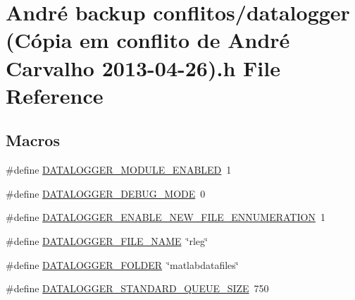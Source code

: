 \hypertarget{datalogger_01_07C_xC3_xB3pia_01em_01conflito_01de_01Andr_xC3_xA9_01Carvalho_012013-04-26_08_8h}{\section{André backup conflitos/datalogger (Cópia em conflito de André Carvalho 2013-\/04-\/26).h File Reference}
\label{datalogger_01_07C_xC3_xB3pia_01em_01conflito_01de_01Andr_xC3_xA9_01Carvalho_012013-04-26_08_8h}
}
\subsection*{Macros}
\begin{DoxyCompactItemize}
\item 
\#define \hyperlink{datalogger_01_07C_xC3_xB3pia_01em_01conflito_01de_01Andr_xC3_xA9_01Carvalho_012013-04-26_08_8h_ac8cb2695f86c0cbaffc8a955d446bcd8}{D\-A\-T\-A\-L\-O\-G\-G\-E\-R\-\_\-\-M\-O\-D\-U\-L\-E\-\_\-\-E\-N\-A\-B\-L\-E\-D}~1
\item 
\#define \hyperlink{datalogger_01_07C_xC3_xB3pia_01em_01conflito_01de_01Andr_xC3_xA9_01Carvalho_012013-04-26_08_8h_ae7698fd72f0fc0920eba24d963a25d5a}{D\-A\-T\-A\-L\-O\-G\-G\-E\-R\-\_\-\-D\-E\-B\-U\-G\-\_\-\-M\-O\-D\-E}~0
\item 
\#define \hyperlink{datalogger_01_07C_xC3_xB3pia_01em_01conflito_01de_01Andr_xC3_xA9_01Carvalho_012013-04-26_08_8h_a88583f16b8f2052b817854218252cd3e}{D\-A\-T\-A\-L\-O\-G\-G\-E\-R\-\_\-\-E\-N\-A\-B\-L\-E\-\_\-\-N\-E\-W\-\_\-\-F\-I\-L\-E\-\_\-\-E\-N\-N\-U\-M\-E\-R\-A\-T\-I\-O\-N}~1
\item 
\#define \hyperlink{datalogger_01_07C_xC3_xB3pia_01em_01conflito_01de_01Andr_xC3_xA9_01Carvalho_012013-04-26_08_8h_a23bf1fb88a2adab92e7c477d927b241c}{D\-A\-T\-A\-L\-O\-G\-G\-E\-R\-\_\-\-F\-I\-L\-E\-\_\-\-N\-A\-M\-E}~\char`\"{}rleg\char`\"{}
\item 
\#define \hyperlink{datalogger_01_07C_xC3_xB3pia_01em_01conflito_01de_01Andr_xC3_xA9_01Carvalho_012013-04-26_08_8h_a29791c024463d251eeab6973a0299e7b}{D\-A\-T\-A\-L\-O\-G\-G\-E\-R\-\_\-\-F\-O\-L\-D\-E\-R}~\char`\"{}matlabdatafiles\char`\"{}
\item 
\#define \hyperlink{datalogger_01_07C_xC3_xB3pia_01em_01conflito_01de_01Andr_xC3_xA9_01Carvalho_012013-04-26_08_8h_ac244ccff7e47d7f9e79c1b606664f4fa}{D\-A\-T\-A\-L\-O\-G\-G\-E\-R\-\_\-\-S\-T\-A\-N\-D\-A\-R\-D\-\_\-\-Q\-U\-E\-U\-E\-\_\-\-S\-I\-Z\-E}~750

\end{DoxyCompactItemize}
